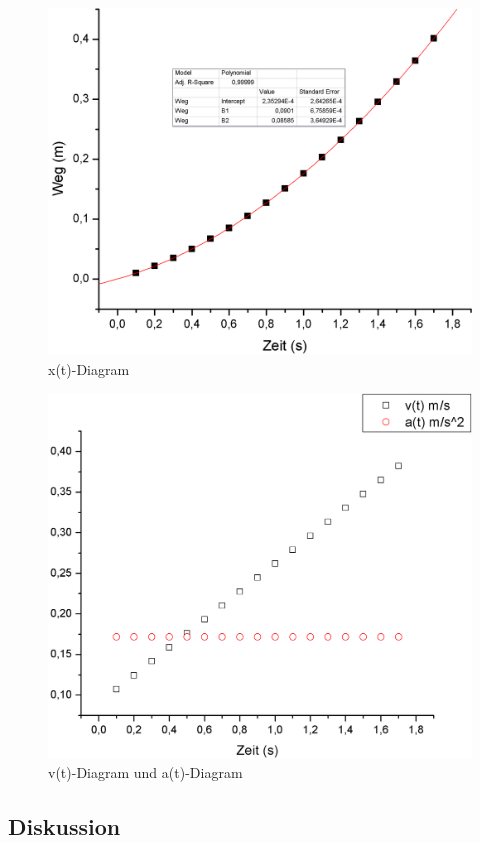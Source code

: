 \documentclass[12pt,a4paper]{article}
\begin{document}
\begin{figure}[H]
	\centering
	\includegraphics[scale=0.4]{./figure/x_t_diagram.png}
	\caption{x(t)-Diagram}
	\label{fig:lin_bewegung}
\end{figure}
\begin{figure}[H]
	\centering
	\includegraphics[scale=0.4]{./figure/v_a_t_diagram.png}
	\caption{v(t)-Diagram und a(t)-Diagram}
	\label{fig:lin_bewegung_v_a}
\end{figure}
\begin{multicols}{2}

\subsection{Diskussion}

\end{multicols}
\end{document}
